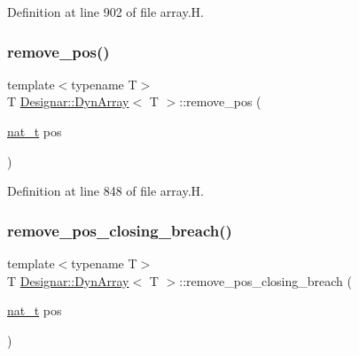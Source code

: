 Definition at line 902 of file array.\+H.

\mbox{\label{class_designar_1_1_dyn_array_a85bfa3cc9b650ae6774c17bd4a03c677}} 
\subsubsection{\texorpdfstring{remove\+\_\+pos()}{remove\_pos()}}
{\footnotesize\ttfamily template$<$typename T$>$ \\
T \hyperlink{class_designar_1_1_dyn_array}{Designar\+::\+Dyn\+Array}$<$ T $>$\+::remove\+\_\+pos (\begin{DoxyParamCaption}\item[{\hyperlink{namespace_designar_aa72662848b9f4815e7bf31a7cf3e33d1}{nat\+\_\+t}}]{pos }\end{DoxyParamCaption})\hspace{0.3cm}{\ttfamily [inline]}}



Definition at line 848 of file array.\+H.

\mbox{\label{class_designar_1_1_dyn_array_ac7451bfdc3b008a478fbfe03478e736d}} 
\subsubsection{\texorpdfstring{remove\+\_\+pos\+\_\+closing\+\_\+breach()}{remove\_pos\_closing\_breach()}}
{\footnotesize\ttfamily template$<$typename T$>$ \\
T \hyperlink{class_designar_1_1_dyn_array}{Designar\+::\+Dyn\+Array}$<$ T $>$\+::remove\+\_\+pos\+\_\+closing\+\_\+breach (\begin{DoxyParamCaption}\item[{\hyperlink{namespace_designar_aa72662848b9f4815e7bf31a7cf3e33d1}{nat\+\_\+t}}]{pos }\end{DoxyParamCaption})\hspace{0.3cm}{\ttfamily [inline]}}




